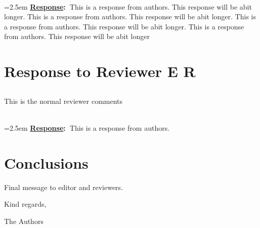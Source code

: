 \documentclass{article}
\newcommand{\answer}[1]{~\\\vspace{0.1em} \hangindent=2.5em \textbf{\textcolor{NavyBlue}{\uline{Response}:~}}\textcolor{NavyBlue}{#1}}
\newcommand\getcurrentref[1]{%
	\ifnumequal{\value{#1}}{0}
	{E}
	{R\the\value{#1}}%
}
\newcommand{\getCurrentSectionNumber}{\getcurrentref{section}}
\begin{document}
	\answer {This is a response from authors. This response will be abit longer. This is a response from authors. This response will be abit longer. This is a response from authors. This response will be abit longer. This is a response from authors. This response will be abit longer }
	
	\section{Response to Reviewer \getCurrentSectionNumber}
	
	\subsection{} This is the normal reviewer comments
	
	\answer {This is a response from authors. }
		
	\section{Conclusions}
	
	Final message to editor and reviewers.
	
	\hfill Kind regards,
	
	\hfill The Authors
\end{document}
